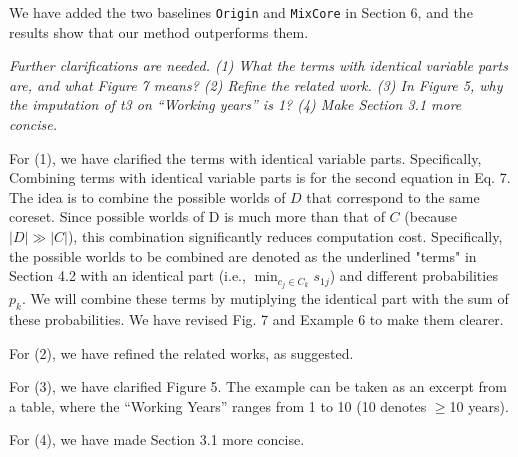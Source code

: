 \noindent 
[\textbf{R}] We have added the two baselines \texttt{Origin} and \texttt{MixCore} in Section 6, and the results show that our method outperforms them.



\textit{Further  clarifications are needed.
	(1) What the terms with identical variable parts are, and what Figure 7 means?
	(2) Refine the related work.
	(3) In Figure 5, why the imputation of t3 on ``Working years'' is 1? 
	(4) Make Section 3.1 more concise.
	}

\noindent 
[\textbf{R}] For (1), we have clarified the  terms with identical variable parts. Specifically, Combining terms with identical variable parts is for the second equation in Eq. 7. The idea is to combine the possible worlds of $D$ that correspond to the same coreset. Since possible worlds of D is much more than that of $C$ (because $|D|\gg|C|$), this combination significantly reduces computation cost. Specifically, the possible worlds to be combined are denoted as the underlined "terms" in Section 4.2 with an identical part (i.e., $\min_{c_j\in C_k} s_{1j}$) and different probabilities $p_k$. We will combine these terms by mutiplying the identical part with the sum of these probabilities.
We have revised Fig. 7 and  Example 6 to make them clearer.

For (2), we have  refined the related works, as suggested.


For (3), we have clarified  Figure 5. The example can be taken as an excerpt from a table, where the ``Working Years'' ranges from 1 to 10  (10 denotes $\geq$10 years).


For (4), we have made  Section 3.1 more concise.


